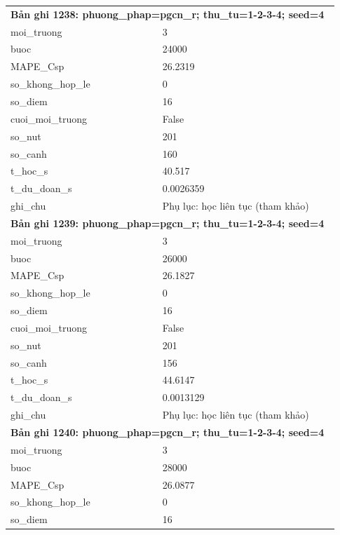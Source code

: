 \begin{longtable}{p{0.43\linewidth}p{0.50\linewidth}}
\midrule
\multicolumn{2}{p{0.95\linewidth}}{\textbf{Bản ghi 1238: phuong\_phap=pgcn\_r; thu\_tu=1-2-3-4; seed=4}} \\
moi\_\allowbreak truong & 3 \\
buoc & 24000 \\
MAPE\_\allowbreak Csp & 26.2319 \\
so\_\allowbreak khong\_\allowbreak hop\_\allowbreak le & 0 \\
so\_\allowbreak diem & 16 \\
cuoi\_\allowbreak moi\_\allowbreak truong & False \\
so\_\allowbreak nut & 201 \\
so\_\allowbreak canh & 160 \\
t\_\allowbreak hoc\_\allowbreak s & 40.517 \\
t\_\allowbreak du\_\allowbreak doan\_\allowbreak s & 0.0026359 \\
ghi\_\allowbreak chu & Phụ lục: học liên tục (tham khảo) \\
\midrule
\multicolumn{2}{p{0.95\linewidth}}{\textbf{Bản ghi 1239: phuong\_phap=pgcn\_r; thu\_tu=1-2-3-4; seed=4}} \\
moi\_\allowbreak truong & 3 \\
buoc & 26000 \\
MAPE\_\allowbreak Csp & 26.1827 \\
so\_\allowbreak khong\_\allowbreak hop\_\allowbreak le & 0 \\
so\_\allowbreak diem & 16 \\
cuoi\_\allowbreak moi\_\allowbreak truong & False \\
so\_\allowbreak nut & 201 \\
so\_\allowbreak canh & 156 \\
t\_\allowbreak hoc\_\allowbreak s & 44.6147 \\
t\_\allowbreak du\_\allowbreak doan\_\allowbreak s & 0.0013129 \\
ghi\_\allowbreak chu & Phụ lục: học liên tục (tham khảo) \\
\midrule
\multicolumn{2}{p{0.95\linewidth}}{\textbf{Bản ghi 1240: phuong\_phap=pgcn\_r; thu\_tu=1-2-3-4; seed=4}} \\
moi\_\allowbreak truong & 3 \\
buoc & 28000 \\
MAPE\_\allowbreak Csp & 26.0877 \\
so\_\allowbreak khong\_\allowbreak hop\_\allowbreak le & 0 \\
so\_\allowbreak diem & 16 \\

\end{longtable}
